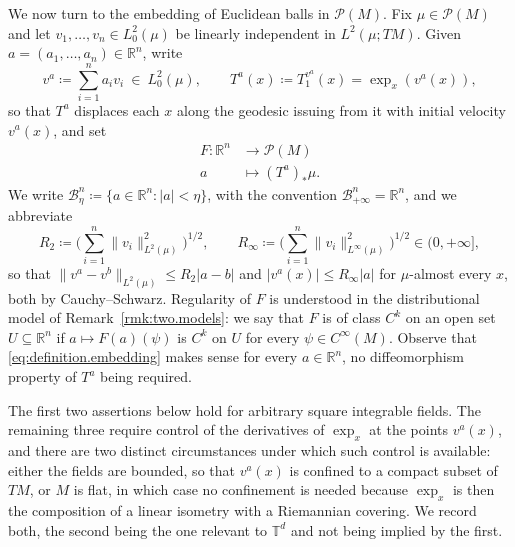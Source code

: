 \documentclass[11pt,reqno]{amsart}
\theoremstyle{plain}
\theoremstyle{definition}
\newcommand{\T}{\mathbb{T}}
\newcommand{\R}{\mathbb{R}}
\newcommand{\lto}{\longrightarrow}
\newcommand{\Prob}{\mathcal{P}}
\begin{document}
We now turn to the embedding of Euclidean balls in \( \Prob(M) \).
Fix \( \mu\in\Prob(M) \) and let \( v_1,\dots,v_n\in L^2_0(\mu) \) be linearly independent in \( L^2(\mu;TM) \).
Given \( a=(a_1,\dots,a_n)\in\R^n \), write
\[
    v^a\coloneqq\sum_{i=1}^na_iv_i\ \in\ L^2_0(\mu),
    \qquad T^a(x)\coloneqq  T^{v^a}_1(x) = \exp_x\!\left(v^a(x)\right),
\]
so that \( T^a \) displaces each \( x \) along the geodesic issuing from it with initial velocity \( v^a(x) \), and set
\begin{equation}\label{eq:definition.embedding}
\begin{split}
    F:\R^n&\lto\Prob(M) \\
        a &\mapsto (T^a)_\ast\mu.
\end{split}
\end{equation}
We write \( \mathcal B^n_\eta\coloneqq\{a\in\R^n:\lvert a\rvert<\eta\} \), with the convention \( \mathcal B^n_{+\infty}=\R^n \), and we abbreviate
\[
    R_2\coloneqq\Big(\sum_{i=1}^n\lVert v_i\rVert^2_{L^2(\mu)}\Big)^{1/2}, \qquad
    R_\infty\coloneqq\Big(\sum_{i=1}^n\lVert v_i\rVert^2_{L^\infty(\mu)}\Big)^{1/2}\in(0,+\infty] ,
\]
so that \( \lVert v^a-v^b\rVert_{L^2(\mu)}\le R_2\lvert a-b\rvert \) and \( \lvert v^a(x)\rvert\le R_\infty\lvert a\rvert \) for \( \mu \)-almost every \( x \), both by Cauchy--Schwarz.
Regularity of \( F \) is understood in the distributional model of Remark~\ref{rmk:two.models}: we say that \( F \) is of class \( C^k \) on an open set \( U\subseteq\R^n \) if \( a\mapsto F(a)(\psi) \) is \( C^k \) on \( U \) for every \( \psi\in C^\infty(M) \).
Observe that \eqref{eq:definition.embedding} makes sense for every \( a\in\R^n \), no diffeomorphism property of \( T^a \) being required.

The first two assertions below hold for arbitrary square integrable fields.
The remaining three require control of the derivatives of \( \exp_x \) at the points \( v^a(x) \), and there are two distinct circumstances under which such control is available: either the fields are bounded, so that \( v^a(x) \) is confined to a compact subset of \( TM \), or \( M \) is flat, in which case no confinement is needed because \( \exp_x \) is then the composition of a linear isometry with a Riemannian covering.
We record both, the second being the one relevant to \( \T^d \) and not being implied by the first.
\end{document}

